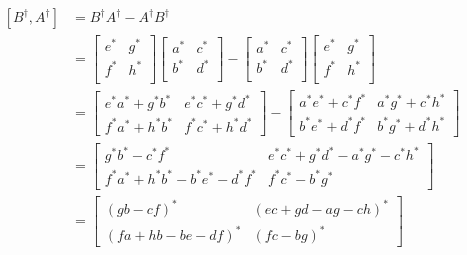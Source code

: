 \documentclass{article}
\begin{document}
\begin{align*}
\begin{split}
    [B^{\dagger}, A^{\dagger}] &= B^{\dagger}A^{\dagger} - A^{\dagger}B^{\dagger} \\
    &= 
    \begin{bmatrix}
        e^* & g^* \\ f^* & h^* \\
    \end{bmatrix}
    \begin{bmatrix}
        a^* & c^* \\ b^* & d^* \\
    \end{bmatrix}
    - \begin{bmatrix}
        a^* & c^* \\ b^* & d^* \\   
    \end{bmatrix}
    \begin{bmatrix}
        e^* & g^* \\ f^* & h^* \\
    \end{bmatrix} \\
    &=
    \begin{bmatrix}
        e^* a^* + g^* b^* & e^* c^* + g^* d^* \\
        f^* a^* + h^* b^* & f^* c^* + h^* d^*
    \end{bmatrix}
    - \begin{bmatrix}
        a^* e^* + c^* f^* & a^* g^* + c^* h^* \\
        b^* e^* + d^* f^* & b^* g^* + d^* h^*
    \end{bmatrix} \\
    &=
    \begin{bmatrix}
       g^* b^* - c^* f^* & e^* c^* + g^* d^* -a^* g^* - c^* h^* \\
        f^* a^* + h^* b^* - b^* e^* - d^* f^* & f^* c^* - b^* g^* 
    \end{bmatrix} \\
    &= 
    \begin{bmatrix}
        (gb - cf)^* & (ec + gd - ag - ch)^* \\
        (fa + hb - be - df)^* & (fc - bg)^*
    \end{bmatrix} \\
\end{split}
\end{align*}
\end{document}
